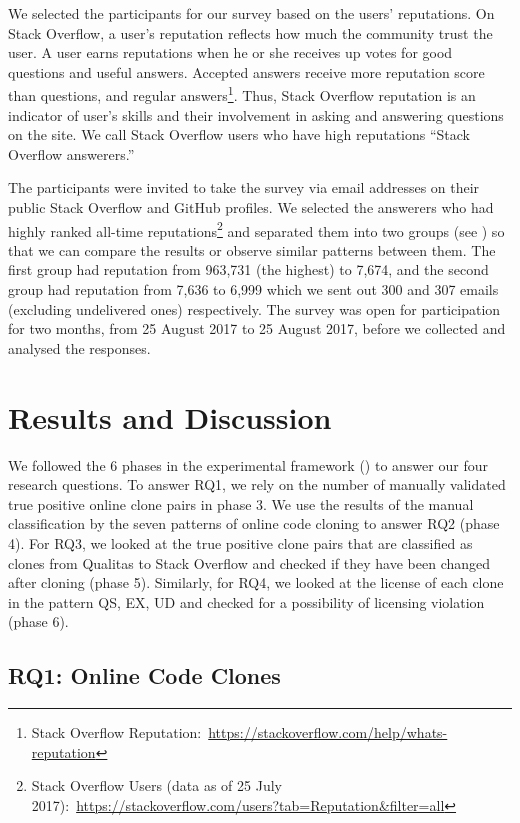 \documentclass[10pt,journal,compsoc]{IEEEtran}
\begin{document}
We selected the participants for our survey based on the users' reputations. On
Stack Overflow, a user's reputation reflects how much the community trust the
user. A user earns reputations when he or she receives up votes for good
questions and useful answers. Accepted answers receive more reputation score
than questions, and regular answers\footnote{Stack Overflow
	Reputation:~\url{https://stackoverflow.com/help/whats-reputation}}. Thus, Stack
Overflow reputation is an indicator of user's skills and their involvement in
asking and answering questions on the site. We call Stack Overflow users who
have high reputations ``Stack Overflow answerers.''

The participants were invited to take the survey via email addresses on their
public Stack Overflow and GitHub profiles. We selected the answerers who had highly
ranked all-time reputations\footnote{Stack Overflow Users (data as of 25 July
	2017):~\url{https://stackoverflow.com/users?tab=Reputation&filter=all}} and
separated them into two groups (see ) so that we can
compare the results or observe similar patterns between them. 
The first group had reputation from 963,731 (the
highest) to 7,674, and the second group had reputation from 7,636 to 6,999 which
we sent out 300 and 307 emails (excluding undelivered ones) respectively. The
survey was open for participation for two months, from 25 August 2017 to 25 August
2017, before we collected and analysed the responses.

\section{Results and Discussion}

We followed the 6 phases in the experimental framework ()
to answer our four research questions. 
To answer RQ1, we rely on the number of manually validated true positive online clone pairs
in phase 3. We use the results of the manual classification by the
seven patterns of online code cloning to answer RQ2 (phase 4). 
For RQ3, we looked at the true positive clone pairs that are classified 
as clones from Qualitas to Stack Overflow and
checked if they have been changed after cloning (phase 5). Similarly, for RQ4, we looked at the license of each clone in the pattern 
QS, EX, UD and checked for a possibility of licensing violation (phase 6).

\subsection{RQ1: Online Code Clones} 
\end{document}
